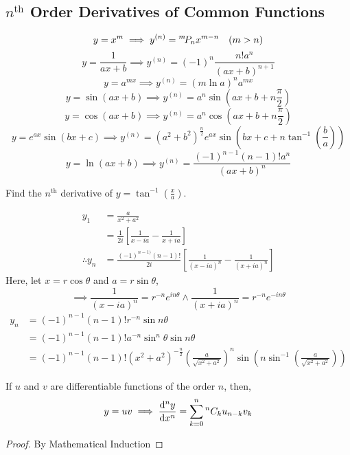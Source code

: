 	\subsection{$n^\text{th}$ Order Derivatives of Common Functions}
	\[y=x^m\implies y^{(n)}={}^{m}\!P_{n} x^{m-n}\quad (m>n)\]
	\[y=\frac{1}{ax+b}\implies y^{(n)}=(-1)^n\frac{n!a^n}{(ax+b)^{n+1}}\]
	\[y=a^{mx}\implies y^{(n)}=(m\ln a)^n a^{mx}\]
	\[y=\sin(ax+b)\implies y^{(n)}=a^n\sin(ax+b+n\frac{\pi}{2})\]
	\[y=\cos(ax+b)\implies y^{(n)}=a^n\cos(ax+b+n\frac{\pi}{2})\]
	\[y=e^{ax}\sin(bx+c)\implies y^{(n)}=(a^2+b^2)^{\frac{n}{2}}e^{ax}\sin(bx+c+n\tan^{-1}(\frac{b}{a}))\]
	\[y=\ln(ax+b)\implies y^{(n)}=\frac{(-1)^{n-1}(n-1)!a^n}{(ax+b)^n}\]
	\begin{eg}
		Find the $n^\text{th}$ derivative of $y=\tan^{-1}(\frac{x}{a})$.
	\end{eg}
	\begin{explanation}
		\[\begin{split}
			y_1&=\frac{a}{x^2+a^2}\\
			&=\frac{1}{2i}\left[\frac{1}{x-ia}-\frac{1}{x+ia}\right]\\
			\therefore y_n&=\frac{(-1)^{n-1)}(n-1)!}{2i}\left[\frac{1}{(x-ia)^n}-\frac{1}{(x+ia)^n}\right]
		\end{split}\]
		Here, let $x=r\cos\theta$ and $a=r\sin\theta$,
		\[\implies \frac{1}{(x-ia)^n}=r^{-n}e^{in\theta} \land \frac{1}{(x+ia)^n}=r^{-n}e^{-in\theta}\]
		\[\begin{split}
			y_n&=(-1)^{n-1}(n-1)!r^{-n}\sin n\theta\\
			&=(-1)^{n-1}(n-1)!a^{-n}\sin^n\theta \sin n\theta\\
			&=(-1)^{n-1}(n-1)!(x^2+a^2)^{-\frac{n}{2}}(\frac{a}{\sqrt{x^2+a^2}})^n\sin(n\sin^{-1}(\frac{a}{\sqrt{x^2+a^2}}))
		\end{split}\]
	\end{explanation}
	\begin{theorem}
		If $u$ and $v$ are differentiable functions of the order $n$, then,
		\[y=uv\implies \dv[n]{y}{x}=\sum_{k=0}^{n}{}^{n}C_{k}u_{n-k}v_k\]
	\end{theorem}
	\begin{proof}
		By Mathematical Induction
	\end{proof}
	
	

